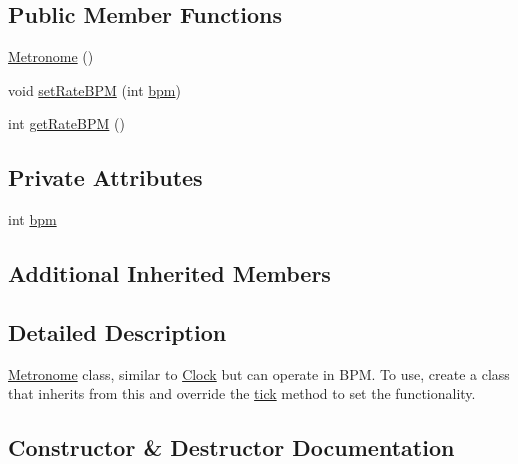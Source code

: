 \subsection*{Public Member Functions}
\begin{DoxyCompactItemize}
\item 
\hyperlink{classdrumpi_1_1clock_1_1Metronome_acc6e0b5140c79326682ec62eb879bf37}{Metronome} ()
\item 
void \hyperlink{classdrumpi_1_1clock_1_1Metronome_a831ff1dbeabee49fb64e468f4ecddaf0}{set\+Rate\+B\+PM} (int \hyperlink{classdrumpi_1_1clock_1_1Metronome_a5319099afdc9537cc8472233e5fbb0cc}{bpm})
\item 
int \hyperlink{classdrumpi_1_1clock_1_1Metronome_acd480d4bfe6d10a1990f9cac7578f071}{get\+Rate\+B\+PM} ()
\end{DoxyCompactItemize}
\subsection*{Private Attributes}
\begin{DoxyCompactItemize}
\item 
int \hyperlink{classdrumpi_1_1clock_1_1Metronome_a5319099afdc9537cc8472233e5fbb0cc}{bpm}
\end{DoxyCompactItemize}
\subsection*{Additional Inherited Members}


\subsection{Detailed Description}
\hyperlink{classdrumpi_1_1clock_1_1Metronome}{Metronome} class, similar to \hyperlink{classdrumpi_1_1clock_1_1Clock}{Clock} but can operate in B\+PM. To use, create a class that inherits from this and override the \hyperlink{classdrumpi_1_1clock_1_1Clock_ade9259c06e6b90bbd92e155a2506d3a1}{tick} method to set the functionality. 

\subsection{Constructor \& Destructor Documentation}
\mbox{\label{classdrumpi_1_1clock_1_1Metronome_acc6e0b5140c79326682ec62eb879bf37}} 

